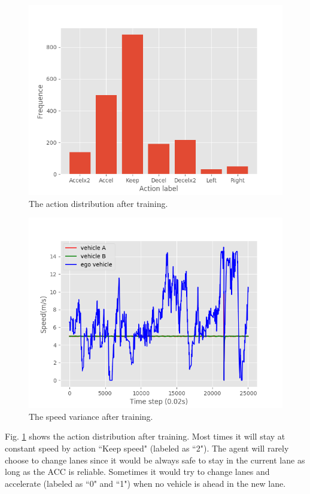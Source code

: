 \begin{figure}[h]
\centering
\includegraphics[width=1.0\textwidth]{figs/ch5/auto_action_distribution}
\caption{The action distribution after training.}
\label{fig:auto-action}
\end{figure}

\begin{figure}[h]
\centering
\includegraphics[width=1.0\textwidth]{figs/ch5/auto_vel}
\caption{The speed variance after training.}
\label{fig:auto-vel}
\end{figure}

Fig. \ref{fig:auto-action} shows the action distribution after training. Most times it will stay at constant speed by action ``Keep speed" (labeled as ``2"). The agent will rarely choose to change lanes since it would be always safe to stay in the current lane as long as the ACC is reliable. Sometimes it would try to change lanes and accelerate (labeled as ``0" and ``1") when no vehicle is ahead in the new lane. 

